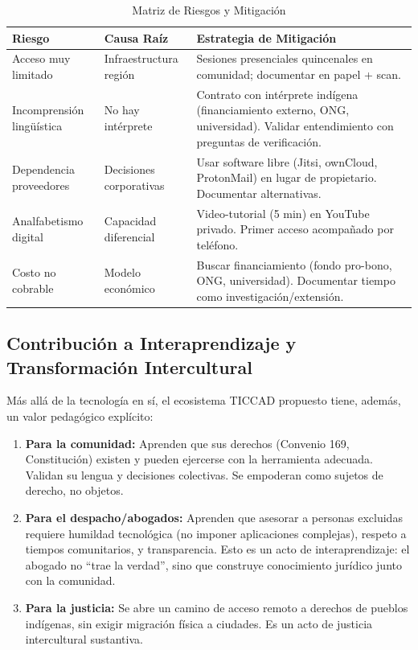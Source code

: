 ﻿\documentclass[
  spanish,
  letterpaper, oneside
]{article}
\begin{document}
\begin{table}[h]
\centering
\small
\begin{tabular}{@{}lll@{}}
\toprule
\textbf{Riesgo} & \textbf{Causa Raíz} & \textbf{Estrategia de Mitigación} \\
\midrule
Acceso muy limitado & Infraestructura región & Sesiones presenciales quincenales en 
comunidad; documentar en papel + scan. \\
\midrule
Incomprensión lingüística & No hay intérprete & Contrato con intérprete indígena 
(financiamiento externo, ONG, universidad). Validar entendimiento con preguntas de 
verificación. \\
\midrule
Dependencia proveedores & Decisiones corporativas & Usar software libre (Jitsi, ownCloud, 
ProtonMail) en lugar de propietario. Documentar alternativas. \\
\midrule
Analfabetismo digital & Capacidad diferencial & Video-tutorial (5 min) en YouTube privado. 
Primer acceso acompañado por teléfono. \\
\midrule
Costo no cobrable & Modelo económico & Buscar financiamiento (fondo pro-bono, ONG, 
universidad). Documentar tiempo como investigación/extensión. \\
\bottomrule
\end{tabular}
\caption{Matriz de Riesgos y Mitigación}
\label{tab:riesgos}
\end{table}

\subsection{Contribución a Interaprendizaje y Transformación Intercultural}

Más allá de la tecnología en sí, el ecosistema TICCAD propuesto tiene, además, un valor pedagógico 
explícito:

\begin{enumerate}
  \item \textbf{Para la comunidad:} Aprenden que sus derechos (Convenio 169, Constitución) 
  existen y pueden ejercerse con la herramienta adecuada. Validan su lengua y decisiones 
  colectivas. Se empoderan como sujetos de derecho, no objetos.
  
  \item \textbf{Para el despacho/abogados:} Aprenden que asesorar a personas excluidas 
  requiere humildad tecnológica (no imponer aplicaciones complejas), respeto a tiempos 
  comunitarios, y transparencia. Esto es un acto de interaprendizaje: el abogado no ``trae 
  la verdad'', sino que construye conocimiento jurídico junto con la comunidad.
  
  \item \textbf{Para la justicia:} Se abre un camino de acceso remoto a derechos de 
  pueblos indígenas, sin exigir migración física a ciudades. Es un acto de justicia 
  intercultural sustantiva.
\end{enumerate}
\end{document}
